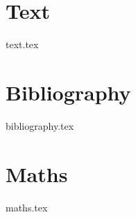 \documentclass{report}
\begin{document}
\chapter{Text}
{text.tex}
\chapter{Bibliography}
{bibliography.tex}
\chapter{Maths}
{maths.tex}
\end{document}

